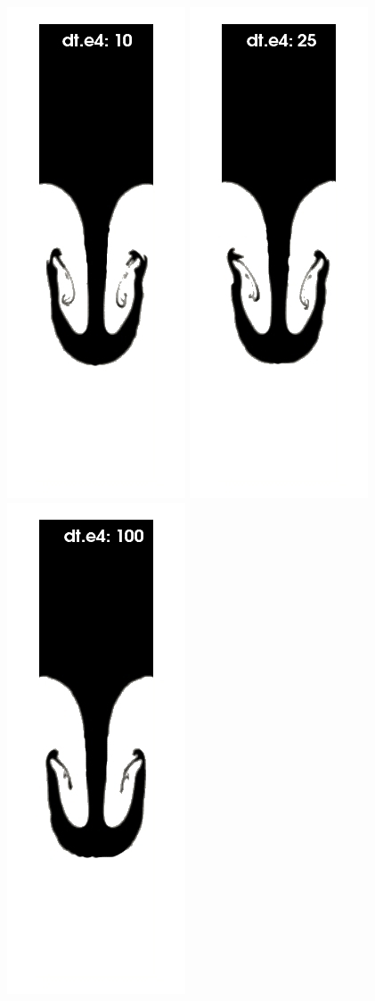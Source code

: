 \begin{figure}[htbp]
\begin{center}
      \includegraphics[width=.24\columnwidth]{images/rayleigh_pfem_dts_A.jpg}
      \includegraphics[width=.24\columnwidth]{images/rayleigh_pfem_dts_B.jpg}
      \includegraphics[width=.24\columnwidth]{images/rayleigh_pfem_dts_C.jpg}

\end{center}
\end{figure}
